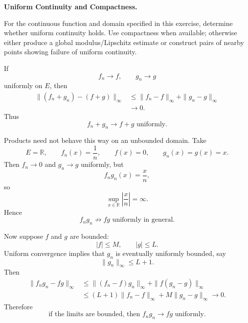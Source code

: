 \begin{problem}[CP-II-0452]
\label{prob:cp-ii-0452}
\textbf{Uniform Continuity and Compactness.}

\hspace*{1.5em}For the continuous function and domain specified in this exercise, determine
whether uniform continuity holds. Use compactness when available; otherwise
either produce a global modulus/Lipschitz estimate or construct pairs of
nearby points showing failure of uniform continuity.
\end{problem}

\begin{solution}
If
\[
f_n\to f,
\qquad
g_n\to g
\]
uniformly on \(E\), then
\[
\begin{aligned}
\|(f_n+g_n)-(f+g)\|_\infty
&\le
\|f_n-f\|_\infty
+
\|g_n-g\|_\infty\\
&\to0.
\end{aligned}
\]
Thus
\[
\boxed{f_n+g_n\to f+g\text{ uniformly}.}
\]

Products need not behave this way on an unbounded domain. Take
\[
E=\mathbb R,
\qquad
f_n(x)=\frac1n,
\qquad
f(x)=0,
\qquad
g_n(x)=g(x)=x.
\]
Then \(f_n\to0\) and \(g_n\to g\) uniformly, but
\[
f_ng_n(x)=\frac xn,
\]
so
\[
\sup_{x\in\mathbb R}\left|\frac xn\right|=\infty.
\]
Hence
\[
\boxed{
f_ng_n\not\to fg
\text{ uniformly in general}.
}
\]

Now suppose \(f\) and \(g\) are bounded:
\[
|f|\le M,
\qquad
|g|\le L.
\]
Uniform convergence implies that \(g_n\) is eventually uniformly bounded, say
\[
\|g_n\|_\infty\le L+1.
\]
Then
\[
\begin{aligned}
\|f_ng_n-fg\|_\infty
&\le
\|(f_n-f)g_n\|_\infty
+
\|f(g_n-g)\|_\infty\\
&\le
(L+1)\|f_n-f\|_\infty
+
M\|g_n-g\|_\infty
\to0.
\end{aligned}
\]
Therefore
\[
\boxed{
\text{if the limits are bounded, then }
f_ng_n\to fg
\text{ uniformly}.
}
\]
\end{solution}


